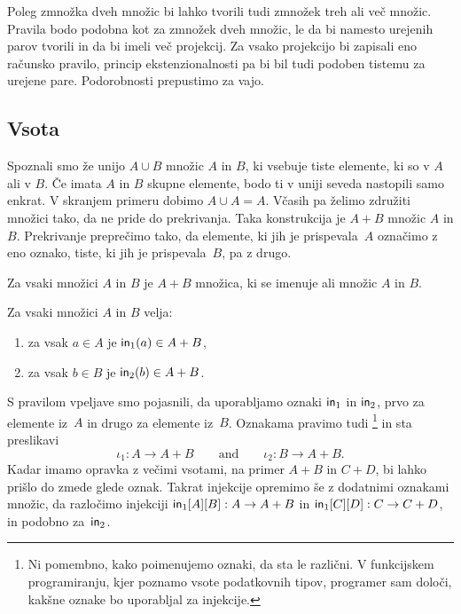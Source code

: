 Poleg zmnožka dveh množic bi lahko tvorili tudi zmnožek treh ali več množic. Pravila bodo
podobna kot za zmnožek dveh množic, le da bi namesto urejenih parov tvorili  in da bi imeli več projekcij. Za vsako projekcijo bi zapisali eno računsko
pravilo, princip ekstenzionalnosti pa bi bil tudi podoben tistemu za urejene pare.
Podorobnosti prepustimo za vajo.


\subsection{Vsota}
\label{sec:vsota}

Spoznali smo že unijo $A \cup B$ množic $A$ in $B$, ki vsebuje tiste elemente, ki so v $A$
ali v $B$. Če imata $A$ in $B$ skupne elemente, bodo ti v uniji seveda nastopili samo
enkrat. V skranjem primeru dobimo $A \cup A = A$. Včasih pa želimo združiti množici tako,
da ne pride do prekrivanja. Taka konstrukcija je  $A + B$ množic $A$ in $B$.
Prekrivanje preprečimo tako, da elemente, ki jih je prispevala~$A$ označimo z eno oznako,
tiste, ki jih je prispevala~$B$, pa z drugo.

\begin{pravilo}[Vsota]
  \label{vsota:tvorba}
  Za vsaki množici $A$ in $B$ je $A + B$ množica, ki se imenuje  ali
   množic $A$ in $B$.
\end{pravilo}

\begin{pravilo}
  \label{vsota:vpeljava}
  Za vsaki množici $A$ in $B$ velja:
  \begin{enumerate}
  \item za vsak $a \in A$ je $\mathsf{in}_{1}(a) \in A + B$,
  \item za vsak $b \in B$ je $\mathsf{in}_{2}(b) \in A + B$.
  \end{enumerate}
\end{pravilo}

S pravilom vpeljave smo pojasnili, da uporabljamo oznaki $\mathsf{in}_{1}$ in $\mathsf{in}_{2}$, prvo za
elemente iz~$A$ in drugo za elemente iz~$B$. Oznakama pravimo tudi
\footnote{Ni pomembno, kako poimenujemo oznaki, da sta le
  različni. V funkcijskem programiranju, kjer poznamo vsote podatkovnih tipov, programer
  sam določi, kakšne oznake bo uporabljal za injekcije.} in sta preslikavi
%
\begin{equation*}
  \iota_1 : A \to A + B
  \qquad\text{and}\qquad
  \iota_2 : B \to A + B.
\end{equation*}
%
Kadar imamo opravka z večimi vsotami, na primer $A + B$ in $C + D$, bi lahko prišlo do
zmede glede oznak. Takrat injekcije opremimo še z dodatnimi oznakami množic, da razločimo
injekciji $\mathsf{in}_{1}[A][B] : A \to A + B$ in $\mathsf{in}_{1}[C][D] : C \to C + D$, in podobno za~$\mathsf{in}_{2}$.

